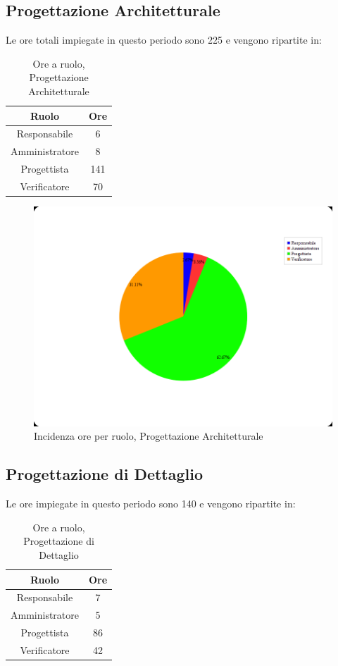 \subsection{Progettazione Architetturale}
Le ore totali impiegate in questo periodo sono 225 e vengono ripartite in:
\begin{table}[H]
	\begin{center}
		\begin{tabular}{|c|c|}
			\hline
			\textbf{Ruolo}	& \textbf{Ore} \\
			\hline
			Responsabile	&	6	\\
			\hline
			Amministratore	&	8	\\
			\hline
			Progettista		&	141	\\
			\hline
			Verificatore	&	70	\\
			\hline
		\end{tabular}
	\end{center}
	\caption{Ore a ruolo, Progettazione Architetturale}
\end{table}

\begin{figure}[H]
	\centering
	\includegraphics[scale=0.3]{immagini/Grafi/OreRuoloPA}
	\caption{Incidenza ore per ruolo, Progettazione Architetturale}
\end{figure}


\subsection{Progettazione di Dettaglio}
Le ore impiegate in questo periodo sono 140 e vengono ripartite in:
\begin{table}[H]
	\begin{center}
		\begin{tabular}{|c|c|}
			\hline
			\textbf{Ruolo}	& \textbf{Ore} \\
			\hline
			Responsabile	&	7	\\
			\hline
			Amministratore	&	5	\\
			\hline
			Progettista		&	86	\\
			\hline
			Verificatore	&	42	\\
			\hline
		\end{tabular}
	\end{center}
	\caption{Ore a ruolo, Progettazione di Dettaglio}
\end{table}

